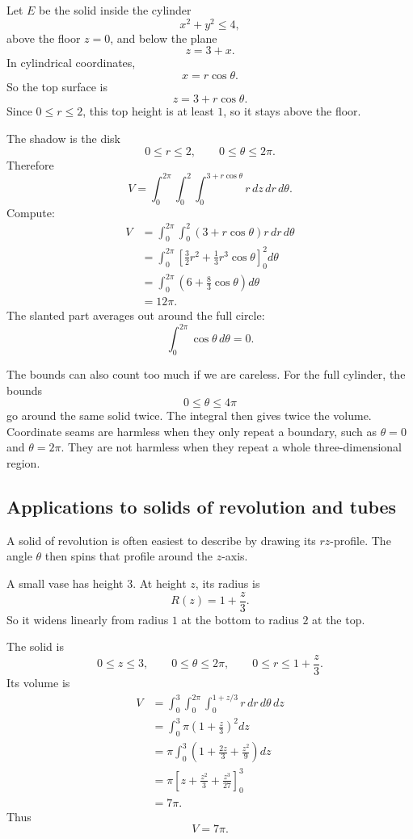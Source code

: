 \begin{example}
Let \(E\) be the solid inside the cylinder
\[
    x^2+y^2\le4,
\]
above the floor \(z=0\), and below the plane
\[
    z=3+x.
\]
In cylindrical coordinates,
\[
    x=r\cos\theta.
\]
So the top surface is
\[
    z=3+r\cos\theta.
\]
Since \(0\le r\le2\), this top height is at least \(1\), so it stays above the floor.

The shadow is the disk
\[
    0\le r\le2,\qquad 0\le\theta\le2\pi.
\]
Therefore
\[
\boxed{
V
=
\int_0^{2\pi}\int_0^2\int_0^{3+r\cos\theta}
r\,dz\,dr\,d\theta.
}
\]
Compute:
\[
\begin{aligned}
V
&=
\int_0^{2\pi}\int_0^2
(3+r\cos\theta)r\,dr\,d\theta\\
&=
\int_0^{2\pi}
\left[
\frac32 r^2+\frac13r^3\cos\theta
\right]_0^2
d\theta\\
&=
\int_0^{2\pi}
\left(
6+\frac83\cos\theta
\right)d\theta\\
&=
12\pi.
\end{aligned}
\]
The slanted part averages out around the full circle:
\[
    \int_0^{2\pi}\cos\theta\,d\theta=0.
\]
\end{example}

The bounds can also count too much if we are careless.  For the full cylinder, the bounds
\[
    0\le\theta\le4\pi
\]
go around the same solid twice.  The integral then gives twice the volume.  Coordinate
seams are harmless when they only repeat a boundary, such as \(\theta=0\) and
\(\theta=2\pi\).  They are not harmless when they repeat a whole three-dimensional
region.

\subsection{Applications to solids of revolution and tubes}

A solid of revolution is often easiest to describe by drawing its \(rz\)-profile.  The
angle \(\theta\) then spins that profile around the \(z\)-axis.

\begin{example}
A small vase has height \(3\).  At height \(z\), its radius is
\[
    R(z)=1+\frac z3.
\]
So it widens linearly from radius \(1\) at the bottom to radius \(2\) at the top.

The solid is
\[
    0\le z\le3,\qquad
    0\le\theta\le2\pi,\qquad
    0\le r\le 1+\frac z3.
\]
Its volume is
\[
\begin{aligned}
V
&=
\int_0^3\int_0^{2\pi}\int_0^{1+z/3} r\,dr\,d\theta\,dz\\
&=
\int_0^3
\pi\left(1+\frac z3\right)^2
dz\\
&=
\pi\int_0^3
\left(1+\frac{2z}{3}+\frac{z^2}{9}\right)dz\\
&=
\pi\left[
z+\frac{z^2}{3}+\frac{z^3}{27}
\right]_0^3\\
&=
7\pi.
\end{aligned}
\]
Thus
\[
\boxed{
    V=7\pi.
}
\]
\end{example}

